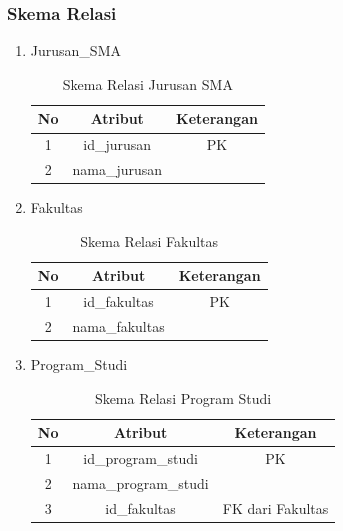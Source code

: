 \subsubsection{Skema Relasi}

\begin{enumerate}
    \item Jurusan\_SMA
    
        \begin{table}[H]
            \centering
            \begin{tabular}{|c|c|c|}
                \hline
                No & Atribut & Keterangan \\
                \hline
                1 & id\_jurusan & PK \\
                \hline
                2 & nama\_jurusan & \\
                \hline
            \end{tabular}
            \caption{Skema Relasi Jurusan SMA}
            \label{tab:skema relasi jurusan sma}
        \end{table}
    
    \item Fakultas
    
        \begin{table}[H]
            \centering
            \begin{tabular}{|c|c|c|}
                \hline
                No & Atribut & Keterangan \\
                \hline
                1 & id\_fakultas & PK \\
                \hline
                2 & nama\_fakultas & \\
                \hline
            \end{tabular}
            \caption{Skema Relasi Fakultas}
            \label{tab:skema relasi fakultas}
        \end{table}
        
    \item Program\_Studi
        
        \begin{table}[H]
            \centering
            \begin{tabular}{|c|c|c|}
                \hline
                No & Atribut & Keterangan \\
                \hline
                1 & id\_program\_studi & PK \\
                \hline
                2 & nama\_program\_studi & \\
                \hline
                3 & id\_fakultas & FK dari Fakultas \\
                \hline
            \end{tabular}
            \caption{Skema Relasi Program Studi}
            \label{tab:skema relasi program studi}
        \end{table}
        

\end{enumerate}
